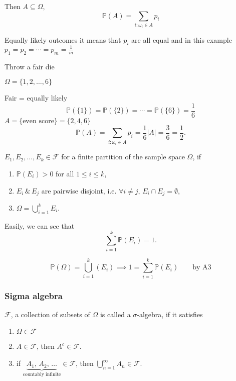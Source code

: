 \documentclass[10pt, a4paper]{article}
\begin{document}
Then $A \subseteq \Omega$,
\[
\mathbb{P}(A) = \sum_{i : \omega_i \in A}p_i
\]

Equally likely outcomes it means that $p_i$ are all equal and in this example $p_1 = p_2 = \dotsi = p_m = \frac{1}{m}$

\begin{example}
    Throw a fair die

    $\Omega = \{1, 2, \dots, 6\}$

    Fair = equally likely
    \[
    \mathbb{P}(\{1\}) = \mathbb{P}(\{2\}) = \dotsi = \mathbb{P}(\{6\}) = \frac{1}{6}
    \]
    $A = \{\text{even score}\} = \{2, 4, 6\}$
    \[
    \mathbb{P}(A) = \sum_{i : \omega_i \in A}p_i = \frac{1}{6}|A| = \frac{3}{6} = \frac{1}{2}.
    \]
\end{example}


\begin{definition}[Partition]
    $E_1, E_2,\dotsc,E_k \in \mathcal{F}$ for a finite partition of the sample space $\Omega$, if
    \begin{enumerate}[label = (\roman*)]
        \item $\mathbb{P}(E_i) > 0$ for all $1 \leq i \leq k$,
        \item $E_i\,\&\,E_j$ are pairwise disjoint, i.e. $\forall i \neq j,\,E_i \cap E_j = \emptyset$,
        \item $\displaystyle\Omega = \bigcup_{i = 1}^{k}E_i$.
    \end{enumerate}
\end{definition}
Easily, we can see that
\[
\sum_{i = 1}^{k} \mathbb{P}(E_i) = 1.
\]

\[
\mathbb{P}(\Omega) = \bigcup_{i = 1}^{k}(E_i) \implies 1 = \sum_{i = 1}^{k}\mathbb{P}(E_i)\qquad\text{by A3}
\]


\subsubsection{Sigma algebra}
\begin{definition}
    $\mathcal{F}$, a collection of subsets of $\Omega$ is called a $\sigma$-algebra, if it satisfies
    \begin{enumerate}[label = (S\arabic*)]
        \item $\Omega \in \mathcal{F}$
        \item $A \in \mathcal{F}$, then $A ^ c \in \mathcal{F}$.
        \item if $\underbrace{A_1,\,A_2,\,\dotsc}_{\text{countably infinite}} \in \mathcal{F}$, then $\bigcup_{n = 1}^{\infty}A_n \in \mathcal{F}$.
    \end{enumerate}
\end{definition}
\end{document}

